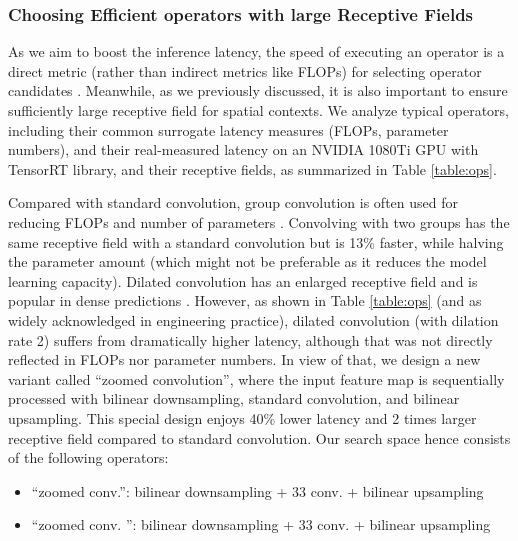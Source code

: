 \documentclass{article} \usepackage{iclr2020_conference,times}
\begin{document}
\subsubsection{Choosing Efficient operators with large Receptive Fields}


As we aim to boost the inference latency, the speed of executing an operator is a direct metric (rather than indirect metrics like FLOPs) for selecting operator candidates . Meanwhile, as we previously discussed, it is also important to ensure sufficiently large receptive field for spatial contexts. 
We analyze typical operators, including their common surrogate latency measures (FLOPs, parameter numbers), and their real-measured latency on an NVIDIA 1080Ti GPU with TensorRT library, and their receptive fields, as summarized in Table \ref{table:ops}.


Compared with standard convolution, group convolution is often used for reducing FLOPs and number of parameters \citep{sandler2018mobilenetv2,ma2018shufflenet}. Convolving with two groups has the same receptive field with a standard convolution but is 13\% faster, while halving the parameter amount (which might not be preferable as it reduces the model learning capacity). 
Dilated convolution has an enlarged receptive field and is popular in dense predictions \citep{chen2018encoder,dai2017deformable}. However, as shown in Table \ref{table:ops} (and as widely acknowledged in engineering practice), dilated convolution (with dilation rate 2) suffers from dramatically higher latency, although that was not directly reflected in FLOPs nor parameter numbers. In view of that, we design a new variant called ``zoomed convolution'', where the input feature map is sequentially processed with bilinear downsampling, standard convolution, and bilinear upsampling. This special design enjoys 40\% lower latency and 2 times larger receptive field compared to standard convolution. 
Our search space hence consists of the following operators:\vspace{-0.9em}
\begin{itemize}
     \vspace{-1.5em}
    \item ``zoomed conv.'': bilinear downsampling + 33 conv. + bilinear upsampling\vspace{-0.5em}
    \item ``zoomed conv. '':  bilinear downsampling + 33 conv.  + bilinear upsampling
\end{itemize}\vspace{-0.5em}
\end{document}
